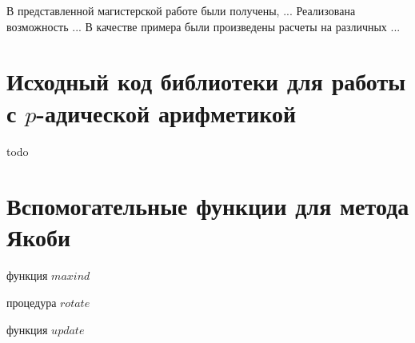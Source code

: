\documentclass[master, och, diploma, times]{sty/SCWorks}
\theoremstyle{plain}
\theoremstyle{definition}
\begin{document}
\conclusion
В представленной магистерской работе были получены, ...
Реализована возможность ...
В качестве примера были произведены расчеты на различных ...




\appendix

\section{Исходный код библиотеки для работы с $p$-адической арифметикой}
todo

\section{Вспомогательные функции для метода Якоби}
\begin{algorithm}
\DontPrintSemicolon %
\caption{функция $maxind$}
\end{algorithm}

\begin{algorithm}
\DontPrintSemicolon %
\caption{процедура $rotate$}
\end{algorithm}

\begin{algorithm}
\DontPrintSemicolon %
\caption{функция $update$}
\end{algorithm}
\end{document}
